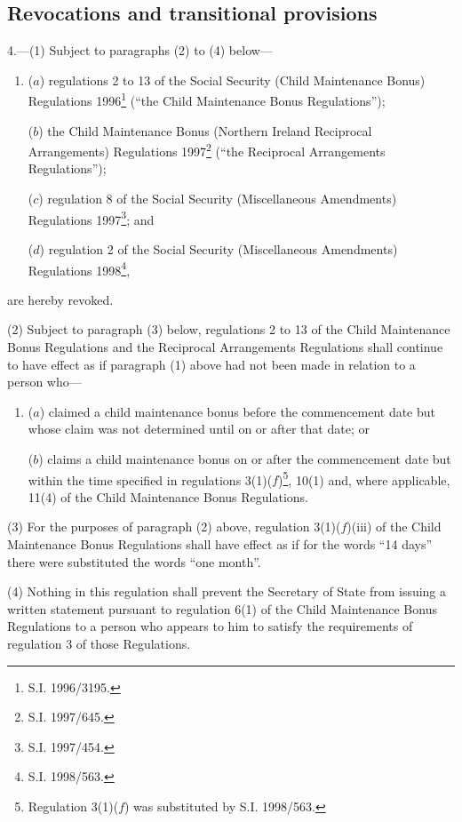 \documentclass[12pt,a4paper]{article}
\begin{document}
\subsection[4. Revocations and transitional provisions]{Revocations and transitional provisions}

4.---(1)  Subject to paragraphs (2) to (4) below—
\begin{enumerate}\item[]
($a$) regulations 2 to 13 of the Social Security (Child Maintenance Bonus) Regulations 1996\footnote{\frenchspacing S.I. 1996/3195.} (“the Child Maintenance Bonus Regulations”);

($b$) the Child Maintenance Bonus (Northern Ireland Reciprocal Arrangements) Regulations 1997\footnote{\frenchspacing S.I. 1997/645.} (“the Reciprocal Arrangements Regulations”);

($c$) regulation 8 of the Social Security (Miscellaneous Amendments) Regulations 1997\footnote{\frenchspacing S.I. 1997/454.}; and

($d$) regulation 2 of the Social Security (Miscellaneous Amendments) Regulations 1998\footnote{\frenchspacing S.I. 1998/563.},
\end{enumerate}
are hereby revoked.

(2) Subject to paragraph (3) below, regulations 2 to 13 of the Child Maintenance Bonus Regulations and the Reciprocal Arrangements Regulations shall continue to have effect as if paragraph (1) above had not been made in relation to a person who—
\begin{enumerate}\item[]
($a$) claimed a child maintenance bonus before the commencement date but whose claim was not determined until on or after that date; or

($b$) claims a child maintenance bonus on or after the commencement date but within the time specified in regulations 3(1)($f$)\footnote{\frenchspacing Regulation 3(1)($f$) was substituted by S.I. 1998/563.}, 10(1) and, where applicable, 11(4) of the Child Maintenance Bonus Regulations.
\end{enumerate}

(3) For the purposes of paragraph (2) above, regulation 3(1)($f$)(iii) of the Child Maintenance Bonus Regulations shall have effect as if for the words “14 days” there were substituted the words “one month”.

(4) Nothing in this regulation shall prevent the Secretary of State from issuing a written statement pursuant to regulation 6(1) of the Child Maintenance Bonus Regulations to a person who appears to him to satisfy the requirements of regulation 3 of those Regulations. 
\end{document}
